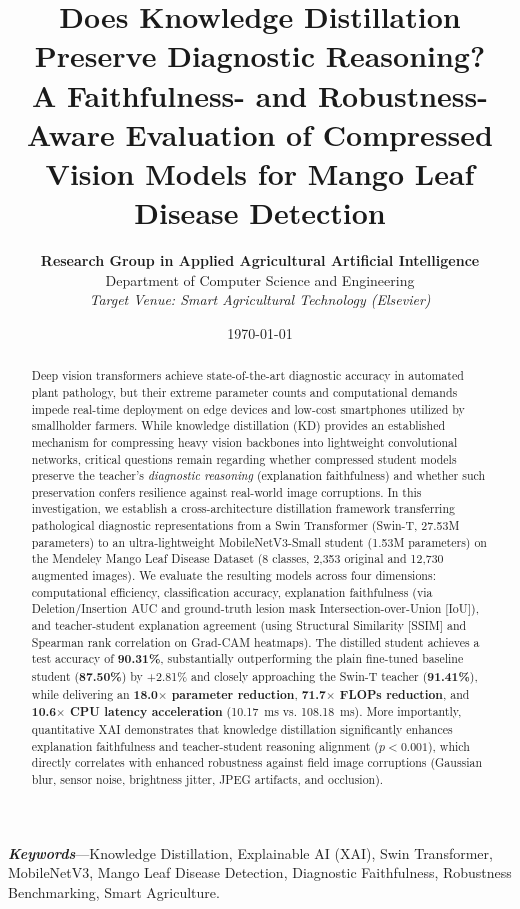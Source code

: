 \documentclass[journal,10pt,twocolumn]{article}
\title{\textbf{\LARGE Does Knowledge Distillation Preserve Diagnostic Reasoning?}\\
\Large A Faithfulness- and Robustness-Aware Evaluation of Compressed Vision Models for Mango Leaf Disease Detection}
\author{
    \textbf{Research Group in Applied Agricultural Artificial Intelligence}\\
    Department of Computer Science and Engineering\\
    \textit{Target Venue: Smart Agricultural Technology (Elsevier)}
}
\date{\today}
\begin{document}
\maketitle

\begin{abstract}
Deep vision transformers achieve state-of-the-art diagnostic accuracy in automated plant pathology, but their extreme parameter counts and computational demands impede real-time deployment on edge devices and low-cost smartphones utilized by smallholder farmers. While knowledge distillation (KD) provides an established mechanism for compressing heavy vision backbones into lightweight convolutional networks, critical questions remain regarding whether compressed student models preserve the teacher's \textit{diagnostic reasoning} (explanation faithfulness) and whether such preservation confers resilience against real-world image corruptions. In this investigation, we establish a cross-architecture distillation framework transferring pathological diagnostic representations from a Swin Transformer (Swin-T, 27.53M parameters) to an ultra-lightweight MobileNetV3-Small student (1.53M parameters) on the Mendeley Mango Leaf Disease Dataset (8 classes, 2,353 original and 12,730 augmented images). We evaluate the resulting models across four dimensions: computational efficiency, classification accuracy, explanation faithfulness (via Deletion/Insertion AUC and ground-truth lesion mask Intersection-over-Union [IoU]), and teacher-student explanation agreement (using Structural Similarity [SSIM] and Spearman rank correlation on Grad-CAM heatmaps). The distilled student achieves a test accuracy of \textbf{90.31\%}, substantially outperforming the plain fine-tuned baseline student (\textbf{87.50\%}) by +2.81\% and closely approaching the Swin-T teacher (\textbf{91.41\%}), while delivering an \textbf{18.0$\times$ parameter reduction}, \textbf{71.7$\times$ FLOPs reduction}, and \textbf{10.6$\times$ CPU latency acceleration} (10.17~ms vs. 108.18~ms). More importantly, quantitative XAI demonstrates that knowledge distillation significantly enhances explanation faithfulness and teacher-student reasoning alignment ($p < 0.001$), which directly correlates with enhanced robustness against field image corruptions (Gaussian blur, sensor noise, brightness jitter, JPEG artifacts, and occlusion).
\end{abstract}

\textbf{\textit{Keywords}}---Knowledge Distillation, Explainable AI (XAI), Swin Transformer, MobileNetV3, Mango Leaf Disease Detection, Diagnostic Faithfulness, Robustness Benchmarking, Smart Agriculture.
\end{document}
